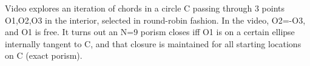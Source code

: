 Video explores an iteration of chords in a circle C passing through 3 points O1,O2,O3 in the interior, selected in round-robin fashion. In the video, O2=-O3, and O1 is free. It turns out an N=9 porism closes iff O1 is on a certain ellipse internally tangent to C, and that closure is maintained for all starting locations on C (exact porism).